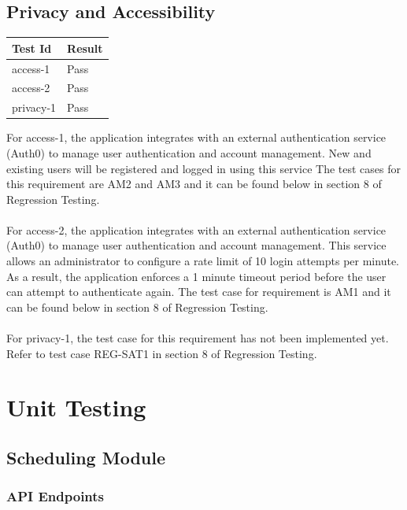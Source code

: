 \documentclass[12pt, titlepage]{article}
\begin{document}
\subsection{Privacy and Accessibility}

\begin{center}
\begin{tabular}{|p{4cm} | p{4cm}| }
\hline
\textbf{Test Id} & \textbf{Result} \\
\hline
access-1 & Pass \\
\hline
access-2 & Pass \\
\hline
privacy-1 & Pass \\
\hline

\end{tabular}
\end{center}

For access-1, the application integrates with an external authentication service (Auth0) to manage user authentication and account management. New and existing users will be registered and logged in using this service The test cases for this requirement are AM2 and AM3 and it can be found below in section 8 of Regression Testing.
\\ \\
For access-2, the application integrates with an external authentication service (Auth0) to manage user authentication and account management. This service allows an administrator to configure a rate limit of 10 login attempts per minute. As a result, the application enforces a 1 minute timeout period before the user can attempt to authenticate again. The test case for requirement is AM1 and it can be found below in section 8 of Regression Testing.
\\ \\
For privacy-1, the test case for this requirement has not been implemented yet. Refer to test case REG-SAT1 in section 8 of Regression Testing.

\section{Unit Testing}

\subsection{Scheduling Module}
\subsubsection{API Endpoints}
\end{document}
